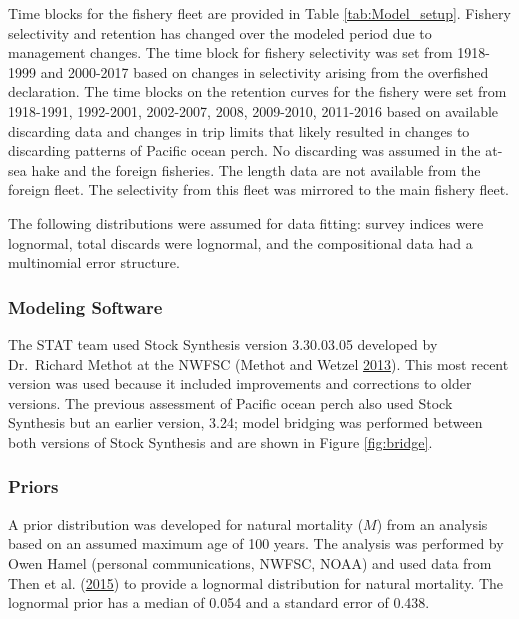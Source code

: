 \documentclass[12pt,]{article}
\begin{document}
Time blocks for the fishery fleet are provided in Table
\ref{tab:Model_setup}. Fishery selectivity and retention has changed
over the modeled period due to management changes. The time block for
fishery selectivity was set from 1918-1999 and 2000-2017 based on
changes in selectivity arising from the overfished declaration. The time
blocks on the retention curves for the fishery were set from 1918-1991,
1992-2001, 2002-2007, 2008, 2009-2010, 2011-2016 based on available
discarding data and changes in trip limits that likely resulted in
changes to discarding patterns of Pacific ocean perch. No discarding was
assumed in the at-sea hake and the foreign fisheries. The length data
are not available from the foreign fleet. The selectivity from this
fleet was mirrored to the main fishery fleet.

The following distributions were assumed for data fitting: survey
indices were lognormal, total discards were lognormal, and the
compositional data had a multinomial error structure.

\subsubsection{Modeling Software}\label{modeling-software}

The STAT team used Stock Synthesis version 3.30.03.05 developed by
Dr.~Richard Methot at the NWFSC (Methot and Wetzel
\protect\hyperlink{ref-methot_stock_2013}{2013}). This most recent
version was used because it included improvements and corrections to
older versions. The previous assessment of Pacific ocean perch also used
Stock Synthesis but an earlier version, 3.24; model bridging was
performed between both versions of Stock Synthesis and are shown in
Figure \ref{fig:bridge}.

\subsubsection{Priors}\label{priors}

A prior distribution was developed for natural mortality (\(M\)) from an
analysis based on an assumed maximum age of 100 years. The analysis was
performed by Owen Hamel (personal communications, NWFSC, NOAA) and used
data from Then et al.
(\protect\hyperlink{ref-then_evaluating_2015}{2015}) to provide a
lognormal distribution for natural mortality. The lognormal prior has a
median of 0.054 and a standard error of 0.438.
\end{document}

